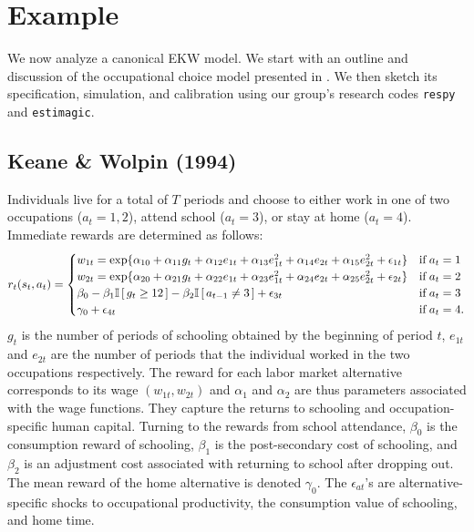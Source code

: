 \section{Example}\label{Example}
We now analyze a canonical EKW model. We start with an outline and discussion of the occupational choice model presented in \citet{Keane.1994}. We then sketch its specification, simulation, and calibration using our group's research codes \verb+respy+ and \verb+estimagic+.
\subsection{Keane \& Wolpin (1994)}
Individuals live for a total of $T$ periods and choose to either work in one of two occupations ($a_t = 1, 2$), attend school ($a_t = 3$), or stay at home ($a_t = 4$). Immediate rewards are determined as follows:
%
\begin{align*}
r_t(s_t, a_t) = \begin{cases} w_{1t} =
\exp\{\alpha_{10} + \alpha_{11}g_t + \alpha_{12}e_{1t} + \alpha_{13}e^2_{1t} + \alpha_{14}e_{2t} + \alpha_{15}e^2_{2t} + \epsilon_{1t}\} & \text{if}\; a_t = 1 \\
w_{2t} = \exp\{\alpha_{20} + \alpha_{21}g_t + \alpha_{22}e_{1t} + \alpha_{23}e^2_{1t} + \alpha_{24}e_{2t} + \alpha_{25}e^2_{2t} + \epsilon_{2t}\}& \text{if}\; a_t = 2 \\
\beta_0 - \beta_1 \mathbb{I}\,[\,g_t \geq 12\,] - \beta_2\mathbb{I}\,[\,a_{t - 1} \neq 3\,] + \epsilon_{3t}& \text{if}\; a_t = 3 \\
\gamma_0 + \epsilon_{4t}& \text{if}\; a_t = 4. \\
\end{cases}
\end{align*}
%
$g_t$ is the number of periods of schooling obtained by the beginning of period $t$, $e_{1t}$ and $e_{2t}$ are the number of periods that the individual worked in the two occupations respectively. The reward for each labor market alternative corresponds to its wage $(w_{1t}, w_{2t})$ and $\alpha_{1}$ and $\alpha_{2}$ are thus parameters associated with the wage functions. They capture the returns to schooling and occupation-specific human capital. Turning to the rewards from school attendance, $\beta_0$ is the consumption reward of schooling, $\beta_1$ is the post-secondary cost of schooling, and $\beta_2$ is an adjustment cost associated with returning to school after dropping out. The mean reward of the home alternative is denoted $\gamma_0$. The $\epsilon_{at}$'s are alternative-specific shocks to occupational productivity, the consumption value of schooling, and home time.\\

